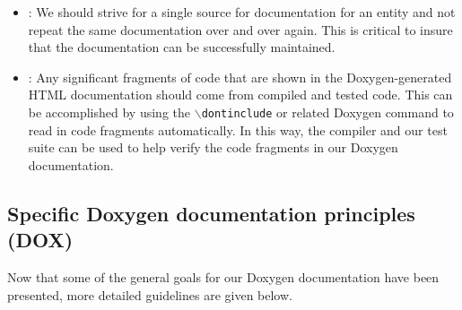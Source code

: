 \begin{itemize}
{}\item\DOXPDoNotRepeat: We should strive for a single source for
documentation for an entity and not repeat the same documentation over and
over again.  This is critical to insure that the documentation can be
successfully maintained.


{}\item\DOXPDocumentationMaintainItself: Any significant fragments of code
that are shown in the Doxygen-generated HTML documentation should come from
compiled and tested code.  This can be accomplished by using the
{}\texttt{$\backslash$dontinclude} or related Doxygen command to read in code
fragments automatically.  In this way, the compiler and our test suite can be
used to help verify the code fragments in our Doxygen documentation.


\end{itemize}


%
\subsection{Specific Doxygen documentation principles (DOX)}
%

Now that some of the general goals for our Doxygen documentation have
been presented, more detailed guidelines are given below.


